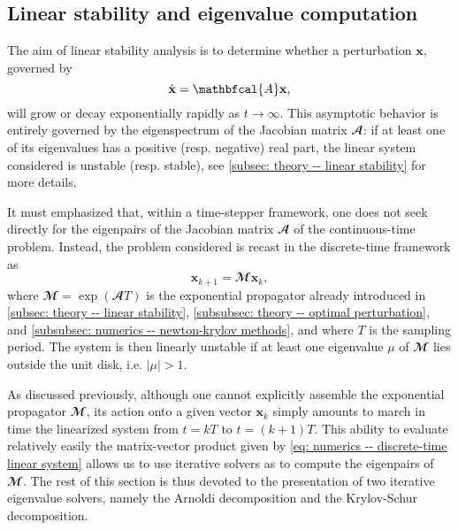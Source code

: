 
  \subsection{Linear stability and eigenvalue computation}

  The aim of linear stability analysis is to determine whether a perturbation $\textbf{x}$, governed by
  \begin{equation}
    \dot{ \mathbf{x} } = \mathbfcal{A} \mathbf{x},
    \notag
  \end{equation}
  will grow or decay exponentially rapidly as $t \to \infty$. This asymptotic behavior is entirely governed by the eigenspectrum of the Jacobian matrix $\mathbfcal{A}$: if at least one of its eigenvalues has a positive (resp. negative) real part, the linear system considered is unstable (resp. stable), see \textsection \ref{subsec: theory -- linear stability} for more details.

  It must emphasized that, within a time-stepper framework, one does not seek directly for the eigenpairs of the Jacobian matrix $\mathbfcal{A}$ of the continuous-time problem. Instead, the problem considered is recast in the discrete-time framework as
  \begin{equation}
    \mathbf{x}_{k+1} = \mathbfcal{M} \mathbf{x}_k,
    \label{eq: numerics -- discrete-time linear system}
  \end{equation}
  where $\mathbfcal{M} = \exp \left( \mathbfcal{A} T \right)$ is the exponential propagator already introduced in \textsection \ref{subsec: theory -- linear stability}, \textsection \ref{subsubsec: theory -- optimal perturbation}, and \textsection \ref{subsubsec: numerics -- newton-krylov methods}, and where $T$ is the sampling period. The system is then linearly unstable if at least one eigenvalue $\mu$ of $\mathbfcal{M}$ lies outside the unit disk, i.e. $\vert \mu \vert > 1$.

  As discussed previously, although one cannot explicitly assemble the exponential propagator $\mathbfcal{M}$, its action onto a given vector $\mathbf{x}_k$ simply amounts to march in time the linearized system from $t = kT$ to $t = (k+1)T$. This ability to evaluate relatively easily the matrix-vector product given by \eqref{eq: numerics -- discrete-time linear system} allows us to use iterative solvers as to compute the eigenpairs of $\mathbfcal{M}$. The rest of this section is thus devoted to the presentation of two iterative eigenvalue solvers, namely the Arnoldi decomposition and the Krylov-Schur decomposition.

